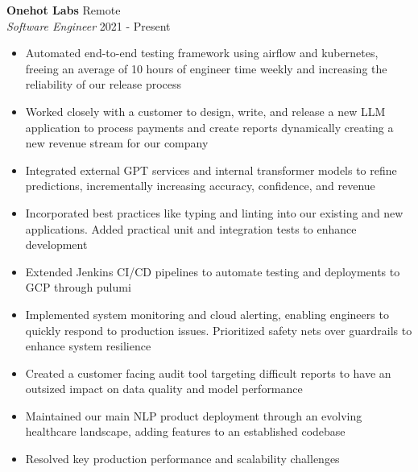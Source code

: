 \documentclass[a4paper]{article}
\begin{document}
\textbf{Onehot Labs} \hfill Remote\\
\textit{Software Engineer} \hfill 2021 - Present\\
\vspace{-1mm}
\begin{itemize} \itemsep 1pt
  \item Automated end-to-end testing framework using airflow and kubernetes, freeing an average of 10 hours of engineer time weekly and increasing the reliability of our release process
  \item Worked closely with a customer to design, write, and release a new LLM application to process payments and create reports dynamically creating a new revenue stream for our company
  \item Integrated external GPT services and internal transformer models to refine predictions, incrementally increasing accuracy, confidence, and revenue
  \item Incorporated best practices like typing and linting into our existing and new applications. Added practical unit and integration tests to enhance development
  \item Extended Jenkins CI/CD pipelines to automate testing and deployments to GCP through pulumi
  \item Implemented system monitoring and cloud alerting, enabling engineers to quickly respond to production issues. Prioritized safety nets over guardrails to enhance system resilience
  \item Created a customer facing audit tool targeting difficult reports to have an outsized impact on data quality and model performance
  \item Maintained our main NLP product deployment through an evolving healthcare landscape, adding features to an established codebase
  \item Resolved key production performance and scalability challenges


\end{itemize}
\end{document}
